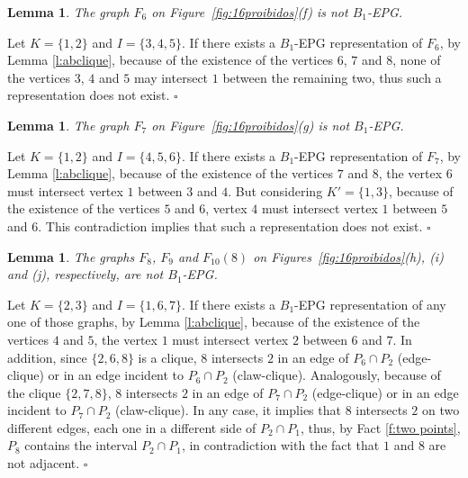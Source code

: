 \documentclass[9pt]{entcs}
\newtheorem{lema}[thm]{Lemma}%
\begin{document}
\begin{pf}
\end{pf}




\begin{lema}\label{lem:F_6}
The graph $F_6$ on Figure~\ref{fig:16proibidos}(f) is not   $B_1$-EPG.
\end{lema}
\begin{pf} Let $K=\{1,2\}$ and $I=\{3,4,5\}$. If there exists a $B_1$-EPG representation of $F_6$,  by Lemma \ref{l:abclique},  because of the existence of the vertices $6$, $7$ and $8$, none of the vertices $3$, $4$ and $5$
may intersect $1$ between the remaining two, thus such a representation does not exist.
 $\square$\end{pf} 


\begin{lema}\label{lem:F_7}
The graph $F_7$ on Figure~\ref{fig:16proibidos}(g) is not   $B_1$-EPG.
\end{lema}
\begin{pf} Let $K=\{1,2\}$ and $I=\{4,5,6\}$. If there exists a $B_1$-EPG representation of $F_7$,  by Lemma \ref{l:abclique},  because of the existence of the vertices  $7$ and $8$, the vertex $6$ must intersect  vertex $1$ between $3$ and $4$. But considering $K'=\{1,3\}$, because of the existence of the vertices $5$ and $6$,  vertex $4$ must intersect vertex $1$ between $5$ and $6$. This contradiction implies that such a representation does not exist.
 $\square$\end{pf} 
 
 \begin{lema}\label{lem:F_8_9_10(8)}
The graphs $F_8$, $F_9$ and $F_{10}(8)$ on Figures~\ref{fig:16proibidos}(h), (i) and (j), respectively, are not   $B_1$-EPG.
\end{lema}
\begin{pf} Let $K=\{2,3\}$ and $I=\{1,6,7\}$. If there exists a $B_1$-EPG representation of any one of those graphs,  by Lemma \ref{l:abclique},  because of the existence of the vertices  $4$ and $5$, the vertex $1$ must intersect  vertex $2$ between $6$ and $7$. In addition, since $\{2,6,8\}$ is a clique, $8$ intersects $2$ in an edge of $P_6\cap P_2$ (edge-clique) or in an edge incident to $P_6\cap P_2$ (claw-clique). Analogously, because of the clique $\{2,7,8\}$,  $8$ intersects $2$ in an edge of $P_7\cap P_2$ (edge-clique) or in an edge incident to $P_7\cap P_2$ (claw-clique). In any case, it implies that $8$ intersects $2$ on two different edges, each one in a different side of $P_2 \cap P_1$, thus, by Fact \ref{f:two points}, $P_8$ contains the interval  $P_2 \cap P_1$, in contradiction with the fact that $1$ and $8$ are not adjacent.
  $\square$\end{pf} 
  
\end{document}

